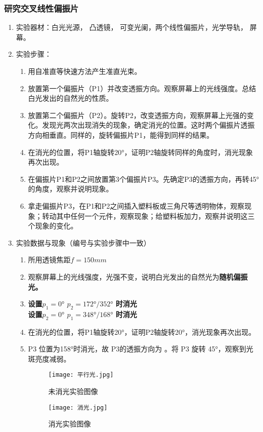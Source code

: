 \documentclass[dvipsnames, svgnames,a4paper,11pt]{article}
\begin{document}
	\subsubsection{研究交叉线性偏振片}
	\begin{enumerate}
	\item 实验器材：白光光源， 凸透镜， 可变光阑，两个线性偏振片，光学导轨， 屏幕。
	\item 实验步骤：
	\begin{enumerate}
		\item 用自准直等快速方法产生准直光束。
		\item 放置第一个偏振片（P1）并改变透振方向。观察屏幕上的光线强度。总结白光发出的自然光的性质。
    
    \item 放置第二个偏振片（P2）。旋转P2，改变透振方向，观察屏幕上光强的变化。发现光两次出现消失的现象，确定消光的位置。这时两个偏振片透振方向相垂直。同样的，旋转偏振片P1，能得到同样的结果。
    
    \item 在消光的位置，将P1轴旋转20°，证明P2轴旋转同样的角度时，消光现象再次出现。
    
    \item 在偏振片P1和P2之间放置第3个偏振片P3。先确定P3的透振方向，再转45°的角度，观察并说明现象。
    
    \item 拿走偏振片P3，在P1和P2之间插入塑料板或三角尺等透明物体，观察现象；转动其中任何一个元件，观察现象；给塑料板加力，观察并说明这三个现象的变化。
	\end{enumerate}	
	\item 实验数据与现象（编号与实验步骤中一致）
	 \begin{enumerate}
		\item 所用透镜焦距$f =150 mm$
		\item 观察屏幕上的光线强度，光强不变，说明白光发出的自然光为\textbf{随机偏振光。}
		\item \textbf{设置$p_1=0°$ \quad $p_2=  172 °/352°$ 时消光\\
		设置$p_2=0°$ \quad$p_1=  348°/168 °$ 时消光}
		\item 在消光的位置，将P1轴旋转20°，证明P2轴旋转20°，消光现象再次出现。
		\item P3 位置为158°时消光，故 P3的透振方向为 。将 P3 旋转 45°，观察到光斑亮度减弱。
		\begin{figure}[H]
			\centering
			\begin{minipage}[b]{0.4\linewidth}
				\centering
				\texttt{[image: 平行光.jpg]}
				\caption{未消光实验图像}
			\end{minipage}
			\hfill
			\begin{minipage}[b]{0.4\linewidth}
				\centering
				\texttt{[image: 消光.jpg]}
				\caption{消光实验图像}
			\end{minipage}
		\end{figure}
		
		
	\end{enumerate}
	
\end{enumerate}	
\end{document}
